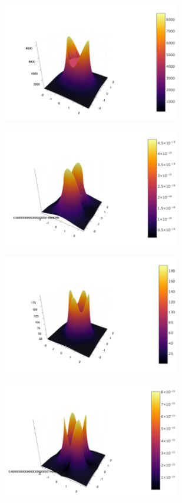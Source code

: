 \documentclass[a4paper,10pt]{article}
\begin{document}
\begin{figure}[htb!]
\begin{subfigure}[b]{0.5\textwidth}
\includegraphics[width=220pt]{E1julia.png}
\caption{}
\label{fig:westminster_lateral}
\end{subfigure}
\begin{subfigure}[b]{0.5\textwidth}
\includegraphics[width=220pt]{H1julia.png}
\caption{}
\end{subfigure}
\begin{subfigure}[b]{0.5\textwidth}
\includegraphics[width=220pt]{E2julia.png}
\caption{}
\end{subfigure}
\begin{subfigure}[b]{0.5\textwidth}
\includegraphics[width=220pt]{H2julia.png}

\end{subfigure}
\end{figure}
\end{document}
